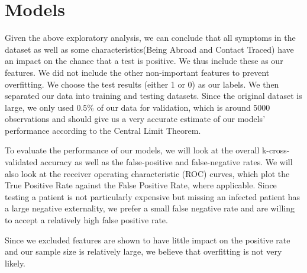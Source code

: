 \documentclass[a4paper, 11pt]{article}
\begin{document}
\section*{Models}
Given the above exploratory analysis, we can conclude that all symptoms in the dataset as well as some characteristics(Being Abroad and Contact Traced) have an impact on the chance that a test is positive. We thus include these as our features. We did not include the other non-important features to prevent overfitting. We choose the test results (either 1 or 0) as our labels. We then separated our data into training and testing datasets. Since the original dataset is large, we only used $0.5\%$ of our data for validation, which is around 5000 observations and should give us a very accurate estimate of our models' performance according to the Central Limit Theorem. \par
To evaluate the performance of our models, we will look at the overall k-cross-validated accuracy as well as the false-positive and false-negative rates. We will also look at the receiver operating characteristic (ROC) curves, which plot the True Positive Rate against the False Positive Rate, where applicable. Since testing a patient is not particularly expensive but missing an infected patient has a large negative externality, we prefer a small false negative rate and are willing to accept a relatively high false positive rate. \par
Since we excluded features are shown to have little impact on the positive rate and our sample size is relatively large, we believe that overfitting is not very likely.
\end{document}
